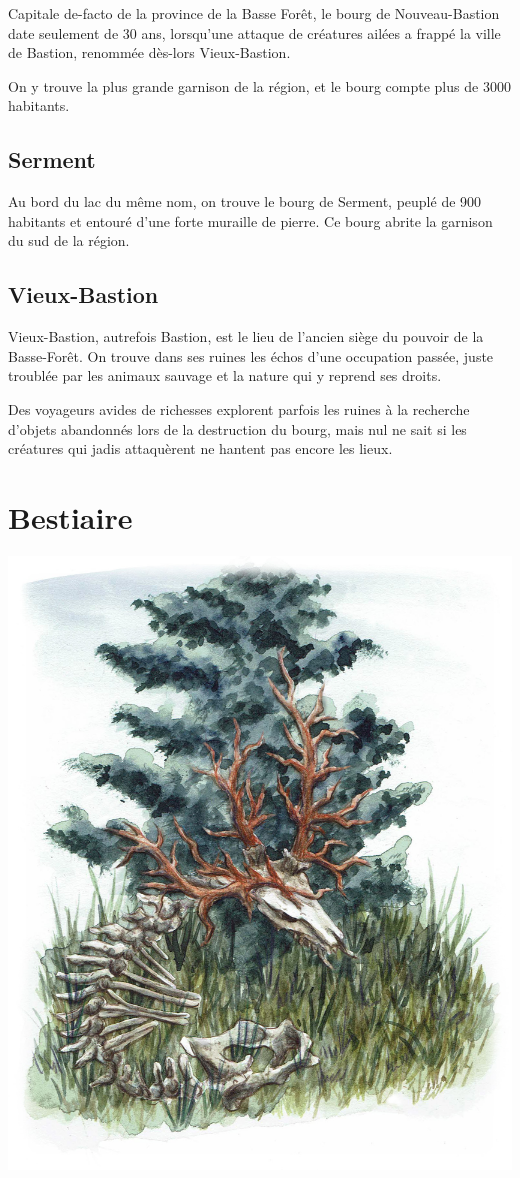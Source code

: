 \documentclass[10pt,twoside,twocolumn,openany,bg=print,justified]{dndbook}
\begin{document}
Capitale de-facto de la province de la Basse Forêt, le bourg de Nouveau-Bastion date seulement de 30 ans, lorsqu'une attaque de créatures ailées a frappé la ville de Bastion, renommée dès-lors Vieux-Bastion.

On y trouve la plus grande garnison de la région, et le bourg compte plus de 3000 habitants.

\subsection*{Serment}

Au bord du lac du même nom, on trouve le bourg de Serment, peuplé de 900 habitants et entouré d'une forte muraille de pierre. Ce bourg abrite la garnison du sud de la région.

\subsection*{Vieux-Bastion}

Vieux-Bastion, autrefois Bastion, est le lieu de l'ancien siège du pouvoir de la Basse-Forêt. On trouve dans ses ruines les échos d'une occupation passée, juste troublée par les animaux sauvage et la nature qui y reprend ses droits.

Des voyageurs avides de richesses explorent parfois les ruines à la recherche d'objets abandonnés lors de la destruction du bourg, mais nul ne sait si les créatures qui jadis attaquèrent ne hantent pas encore les lieux.

\section{Bestiaire}

\includegraphics[width=\columnwidth, keepaspectratio]{img/cervide.jpg}
\end{document}
